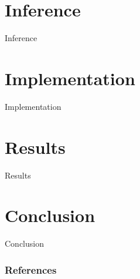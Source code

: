 \documentclass[aspectratio=169]{beamer}
\begin{document}
  \section{Inference} %
  \label{sec:inference}
    \begin{frame}{Inference}

    \end{frame}

  \section{Implementation} %
  \label{sec:implementation}
    \begin{frame}{Implementation}

    \end{frame}

  \section{Results} %
  \label{sec:results}
    \begin{frame}{Results}

    \end{frame}

  \section{Conclusion} %
  \label{sec:conclusion}
    \begin{frame}{Conclusion}

    \end{frame}

  \begin{frame}
    \frametitle{References}
    \tiny
    \begin{multicols}{2}
      \nocite{*}
      
    \end{multicols}
  \end{frame}
\end{document}
